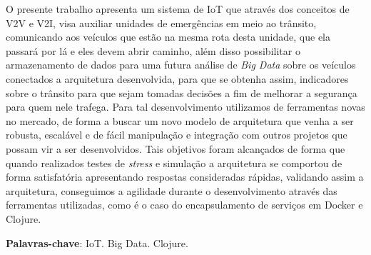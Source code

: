 \setlength{\absparsep}{18pt} %
\begin{resumo}
O presente trabalho apresenta um sistema de IoT que através dos conceitos de V2V e V2I, visa auxiliar unidades de emergências em meio ao trânsito, comunicando aos veículos que estão na mesma rota desta unidade, que ela passará por lá e eles devem abrir caminho, além disso possibilitar o armazenamento de dados para uma futura análise de \textit{Big Data} sobre os veículos conectados a arquitetura desenvolvida, para que se obtenha assim, indicadores sobre o trânsito para que sejam tomadas decisões a fim de melhorar a segurança para quem nele trafega. Para tal desenvolvimento utilizamos de ferramentas novas no mercado, de forma a buscar um novo modelo de arquitetura que venha a ser robusta, escalável e de fácil manipulação e integração com outros projetos que possam vir a ser desenvolvidos. Tais objetivos foram alcançados de forma que quando realizados testes de \textit{stress} e simulação a arquitetura se comportou de forma satisfatória apresentando respostas consideradas rápidas, validando assim a arquitetura, conseguimos a agilidade durante o desenvolvimento através das ferramentas utilizadas, como é o caso do encapsulamento de serviços em Docker e Clojure.

 \textbf{Palavras-chave}: IoT. Big Data. Clojure.
\end{resumo}
